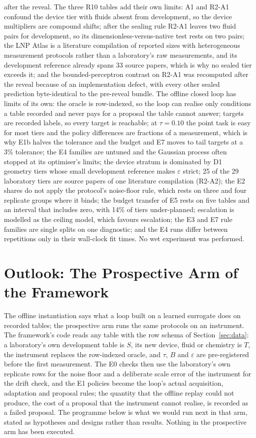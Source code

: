 \documentclass[11pt,a4paper]{article}
\begin{document}
after the reveal. The three R10 tables add their own limits: A1 and R2-A1
confound the device tier with fluids absent from development, so the device
multipliers are compound shifts; after the sealing rule R2-A1 leaves two
fluid pairs for development, so its dimensionless-versus-native test rests on
two pairs; the LNP Atlas is a literature compilation of reported sizes with
heterogeneous measurement protocols rather than a laboratory's raw
measurements, and its development reference already spans 33 source papers,
which is why no sealed tier exceeds it; and the bounded-perceptron contrast on
R2-A1 was recomputed after the reveal because of an implementation defect,
with every other sealed prediction byte-identical to the pre-reveal bundle.
The offline closed loop has limits of its own: the oracle is row-indexed, so
the loop can realise only conditions a table recorded and never pays for a
proposal the table cannot answer; targets are recorded labels, so every target
is reachable; at $\tau = 0.10$ the point task is easy for most tiers and the
policy differences are fractions of a measurement, which is why E1b halves the
tolerance and the budget and E7 moves to tail targets at a 3\% tolerance; the
E4 families are untuned and the Gaussian process often stopped at its
optimiser's limits; the device stratum is dominated by D1 geometry tiers
whose small development reference makes $\varepsilon$ strict; 25 of the 29
laboratory tiers are source papers of one literature compilation (R2-A2); the
E2 shares do not apply the protocol's noise-floor rule, which rests on three
and four replicate groups where it binds; the budget transfer of E5 rests on
five tables and an interval that includes zero, with 14\% of tiers
under-planned; escalation is modelled as the ceiling model, which favours
escalation; the E3 and E7 rule families are single splits on one diagnostic;
and the E4 runs differ between repetitions only in their wall-clock fit times.
No wet experiment was performed.

\section{Outlook: The Prospective Arm of the Framework}
\label{sec:outlook}
The offline instantiation says what a loop built on a learned surrogate does on
recorded tables; the prospective arm runs the same protocols on an instrument.
The framework's code reads any table with the row schema of
Section~\ref{sec:data}: a laboratory's own development table is $S$, its new
device, fluid or chemistry is $T$, the instrument replaces the row-indexed
oracle, and $\tau$, $B$ and $\varepsilon$ are pre-registered before the first
measurement. The E0 checks then use the laboratory's own replicate rows for the
noise floor and a deliberate scale error of the instrument for the drift check, and
the E1 policies become the loop's actual acquisition, adaptation and proposal
rules; the quantity that the offline replay could not produce, the cost of a
proposal that the instrument cannot realise, is recorded as a failed proposal.
The programme below is what we would run next in that arm, stated as
hypotheses and designs rather than results. Nothing in the prospective arm has
been executed.
\end{document}
